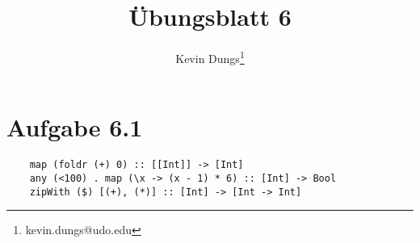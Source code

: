 \documentclass[a4paper]{scrartcl}
\title{Übungsblatt 6}
\author{Kevin Dungs\thanks{kevin.dungs@udo.edu}}
\begin{document}
\maketitle

\section*{Aufgabe 6.1}
\begin{verbatim}
    map (foldr (+) 0) :: [[Int]] -> [Int]
    any (<100) . map (\x -> (x - 1) * 6) :: [Int] -> Bool
    zipWith ($) [(+), (*)] :: [Int] -> [Int -> Int]
\end{verbatim}
\end{document}
